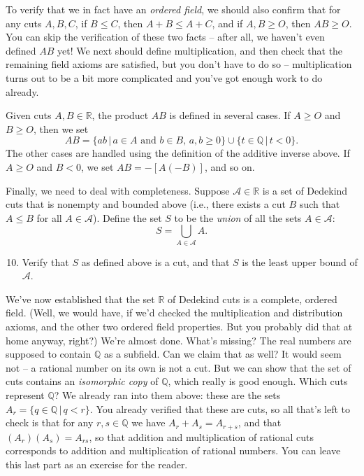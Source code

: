 \documentclass[letterpaper,12pt]{article}
\newcommand{\R}{\mathbb{R}}
\newcommand{\Q}{\mathbb{Q}}
\begin{document}
To verify that we in fact have an {\em ordered field}, we should also confirm that for any cuts $A,B,C$, if $B\leq C$, then $A+B\leq A+C$, and if $A,B\geq O$, then $AB\geq O$. You can skip the verification of these two facts -- after all, we haven't even defined $AB$ yet! We next should define multiplication, and then check that the remaining field axioms are satisfied, but you don't have to do so -- multiplication turns out to be a bit more complicated and you've got enough work to do already.

Given cuts $A,B\in\R$, the product $AB$ is defined in several cases. If $A\geq O$ and $B\geq O$, then we set
\[
 AB = \{ab\,|\, a\in A \text{ and } b\in B,\, a,b\geq 0\}\cup\{t\in\Q\,|\, t<0\}.
\]
The other cases are handled using the definition of the additive inverse above. If $A\geq O$ and $B<0$, we set $AB = -[A(-B)]$, and so on.

\bigskip

Finally, we need to deal with completeness. Suppose $\mathcal{A}\in\R$ is a set of Dedekind cuts that is nonempty and bounded above (i.e., there exists a cut $B$ such that $A\leq B$ for all $A\in\mathcal{A}$). Define the set $S$ to be the {\em union} of all the sets $A\in\mathcal{A}$:
\[
 S = \bigcup_{A\in\mathcal{A}}A.
\]
\begin{enumerate}
\setcounter{enumi}{9}
\item Verify that $S$ as defined above is a cut, and that $S$ is the least upper bound of $\mathcal{A}$.
\end{enumerate}


We've now established that the set $\R$ of Dedekind cuts is a complete, ordered field. (Well, we would have, if we'd checked the multiplication and distribution axioms, and the other two ordered field properties. But you probably did that at home anyway, right?) We're almost done. What's missing? The real numbers are supposed to contain $\Q$ as a subfield. Can we claim that as well? It would seem not -- a rational number on its own is not a cut. But we can show that the set of cuts contains an {\em isomorphic copy} of $\Q$, which really is good enough. Which cuts represent $\Q$? We already ran into them above: these are the sets $A_r = \{q\in\Q\,|\, q<r\}$. You already verified that these are cuts, so all that's left to check is that for any $r,s\in \Q$ we have $A_r+A_s = A_{r+s}$, and that $(A_r)(A_s) = A_{rs}$, so that addition and multiplication of rational cuts corresponds to addition and multiplication of rational numbers. You can leave this last part as an exercise for the reader.
\end{document}

